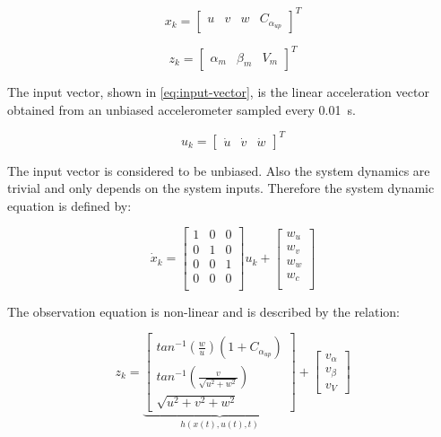\begin{equation}\label{eq:state-vector}
  x_k = 
	\begin{bmatrix}
	u & v & w & C_{\alpha_{up}}
	\end{bmatrix}^T
\end{equation}

\begin{equation}\label{eq:measurement-vector}
  z_k = 
	\begin{bmatrix}
	\alpha_m & \beta_m & V_m
	\end{bmatrix}^T
\end{equation}


The input vector, shown in \autoref{eq:input-vector}, is the linear acceleration vector obtained from an unbiased accelerometer sampled every \SI{0.01}{\second}.

\begin{equation}\label{eq:input-vector}
  u_k =
	\begin{bmatrix}
	\dot{u} & \dot{v} & \dot{w}
	\end{bmatrix}^T
\end{equation}

The input vector is considered to be unbiased. Also the system dynamics are trivial and only depends on the system inputs. Therefore the system dynamic equation is defined by:

\begin{equation*}
  \dot{x}_k =
	\begin{bmatrix}
	1 & 0 & 0\\
	0 & 1 & 0\\
	0 & 0 & 1\\
	0 & 0 & 0\\
	\end{bmatrix}
	u_k
	+
	\begin{bmatrix}
	w_u \\
	w_v \\
	w_w \\
	w_c \\
	\end{bmatrix}
\end{equation*}

The observation equation is non-linear and is described by the relation:

\begin{equation*}
	z_k =
	\underbrace{
	\begin{bmatrix}
	tan^{-1}(\frac{w}{u})(1+C_{\alpha_{up}}) \\
	tan^{-1}(\frac{v}{\sqrt{u^2+w^2}}) \\
	\sqrt{u^2+v^2+w^2}
	\end{bmatrix}
	}_{h(x(t), u(t), t)}
	+
	\begin{bmatrix}
	v_\alpha \\
	v_\beta \\
	v_V
	\end{bmatrix}
\end{equation*}



